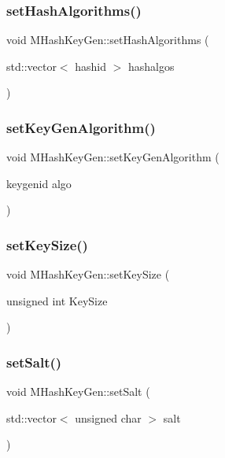\subsubsection{set\+Hash\+Algorithms()}
{\footnotesize\ttfamily void M\+Hash\+Key\+Gen\+::set\+Hash\+Algorithms (\begin{DoxyParamCaption}\item[{std\+::vector$<$ hashid $>$}]{hashalgos }\end{DoxyParamCaption})}

\mbox{\label{classMHashKeyGen_a793284ce053ce3ea4c81a53d2c8d5f3a}} 
\subsubsection{set\+Key\+Gen\+Algorithm()}
{\footnotesize\ttfamily void M\+Hash\+Key\+Gen\+::set\+Key\+Gen\+Algorithm (\begin{DoxyParamCaption}\item[{keygenid}]{algo }\end{DoxyParamCaption})}

\mbox{\label{classMHashKeyGen_afb604d40cffc15747e3e22cf145537bf}} 
\subsubsection{set\+Key\+Size()}
{\footnotesize\ttfamily void M\+Hash\+Key\+Gen\+::set\+Key\+Size (\begin{DoxyParamCaption}\item[{unsigned int}]{Key\+Size }\end{DoxyParamCaption})}

\mbox{\label{classMHashKeyGen_ade5e590e9a7fe3e880a548d5a1f527bd}} 
\subsubsection{set\+Salt()}
{\footnotesize\ttfamily void M\+Hash\+Key\+Gen\+::set\+Salt (\begin{DoxyParamCaption}\item[{std\+::vector$<$ unsigned char $>$}]{salt }\end{DoxyParamCaption})}



